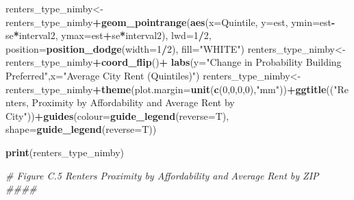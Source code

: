 \documentclass[]{article}
\newenvironment{Shaded}{\begin{snugshade}}{\end{snugshade}}
\newcommand{\CommentTok}[1]{\textcolor[rgb]{0.56,0.35,0.01}{\textit{#1}}}
\newcommand{\DataTypeTok}[1]{\textcolor[rgb]{0.13,0.29,0.53}{#1}}
\newcommand{\DecValTok}[1]{\textcolor[rgb]{0.00,0.00,0.81}{#1}}
\newcommand{\KeywordTok}[1]{\textcolor[rgb]{0.13,0.29,0.53}{\textbf{#1}}}
\newcommand{\NormalTok}[1]{#1}
\newcommand{\OperatorTok}[1]{\textcolor[rgb]{0.81,0.36,0.00}{\textbf{#1}}}
\newcommand{\StringTok}[1]{\textcolor[rgb]{0.31,0.60,0.02}{#1}}
\begin{document}
\begin{Shaded}
\begin{Highlighting}[]
{{{\NormalTok{renters_type_nimby<-renters_type_nimby}\OperatorTok{+}\KeywordTok{geom_pointrange}\NormalTok{(}\KeywordTok{aes}\NormalTok{(}\DataTypeTok{x=}\NormalTok{Quintile, }\DataTypeTok{y=}\NormalTok{est, }\DataTypeTok{ymin=}\NormalTok{est}\OperatorTok{-}\NormalTok{se}\OperatorTok{*}\NormalTok{interval2,}
                                                           \DataTypeTok{ymax=}\NormalTok{est}\OperatorTok{+}\NormalTok{se}\OperatorTok{*}\NormalTok{interval2), }\DataTypeTok{lwd=}\DecValTok{1}\OperatorTok{/}\DecValTok{2}\NormalTok{,}
                                                       \DataTypeTok{position=}\KeywordTok{position_dodge}\NormalTok{(}\DataTypeTok{width=}\DecValTok{1}\OperatorTok{/}\DecValTok{2}\NormalTok{),  }\DataTypeTok{fill=}\StringTok{"WHITE"}\NormalTok{)}
\NormalTok{renters_type_nimby<-renters_type_nimby}\OperatorTok{+}\KeywordTok{coord_flip}\NormalTok{()}\OperatorTok{+}\StringTok{ }\KeywordTok{labs}\NormalTok{(}\DataTypeTok{y=}\StringTok{"Change in Probability Building Preferred"}\NormalTok{,}\DataTypeTok{x=}\StringTok{"Average City Rent (Quintiles)"}\NormalTok{)}
\NormalTok{renters_type_nimby<-renters_type_nimby}\OperatorTok{+}\KeywordTok{theme}\NormalTok{(}\DataTypeTok{plot.margin=}\KeywordTok{unit}\NormalTok{(}\KeywordTok{c}\NormalTok{(}\DecValTok{0}\NormalTok{,}\DecValTok{0}\NormalTok{,}\DecValTok{0}\NormalTok{,}\DecValTok{0}\NormalTok{),}\StringTok{"mm"}\NormalTok{))}\OperatorTok{+}\KeywordTok{ggtitle}\NormalTok{((}\StringTok{"Renters, Proximity by Affordability and Average Rent by City"}\NormalTok{))}\OperatorTok{+}\KeywordTok{guides}\NormalTok{(}\DataTypeTok{colour=}\KeywordTok{guide_legend}\NormalTok{(}\DataTypeTok{reverse=}\NormalTok{T), }\DataTypeTok{shape=}\KeywordTok{guide_legend}\NormalTok{(}\DataTypeTok{reverse=}\NormalTok{T))}


\KeywordTok{print}\NormalTok{(renters_type_nimby)}


\CommentTok{# Figure C.5 Renters Proximity by Affordability and Average Rent by ZIP ####}

}}}
\end{Highlighting}
\end{Shaded}
\end{document}
